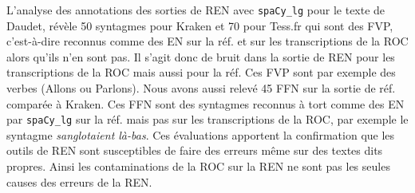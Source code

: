 %     


L'analyse des annotations des sorties de REN avec \texttt{spaCy\_lg} pour le texte de Daudet, révèle 50 syntagmes pour Kraken et 70 pour Tess.fr qui sont des FVP, c'est-à-dire reconnus comme des EN sur la réf. et sur les transcriptions de la ROC alors qu'ils n'en sont pas. Il s'agit donc de bruit dans la sortie de REN pour les transcriptions de la ROC mais aussi pour la réf. Ces FVP sont par exemple des verbes (\og{}Allons\fg{} ou \og{}Parlons\fg{}). Nous avons aussi relevé 45 FFN sur la sortie de réf. comparée à Kraken. Ces FFN sont des syntagmes reconnus à tort comme des EN par \texttt{spaCy\_lg} sur la réf. mais pas sur les transcriptions de la ROC, par exemple le syntagme \textit{\og{}sanglotaient là-bas\fg{}}. Ces évaluations apportent la confirmation que les outils de REN sont susceptibles de faire des erreurs même sur des textes dits \og{}propres\fg{}. Ainsi les contaminations de la ROC sur la REN ne sont pas les seules causes des erreurs de la REN. 




%    
%

